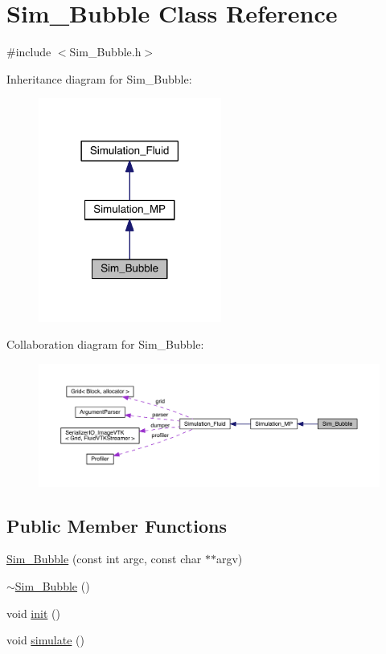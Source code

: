 \hypertarget{class_sim___bubble}{}\section{Sim\+\_\+\+Bubble Class Reference}
\label{class_sim___bubble}


{\ttfamily \#include $<$Sim\+\_\+\+Bubble.\+h$>$}



Inheritance diagram for Sim\+\_\+\+Bubble\+:\nopagebreak
\begin{figure}[H]
\begin{center}
\leavevmode
\includegraphics[width=170pt]{d3/d9c/class_sim___bubble__inherit__graph}
\end{center}
\end{figure}


Collaboration diagram for Sim\+\_\+\+Bubble\+:\nopagebreak
\begin{figure}[H]
\begin{center}
\leavevmode
\includegraphics[width=350pt]{dd/d10/class_sim___bubble__coll__graph}
\end{center}
\end{figure}
\subsection*{Public Member Functions}
\begin{DoxyCompactItemize}
\item 
\hyperlink{class_sim___bubble_aee099c9d070299eec0ef94f190ffb409}{Sim\+\_\+\+Bubble} (const int argc, const char $\ast$$\ast$argv)
\item 
\hyperlink{class_sim___bubble_a61355c24b4da216ebdbc4752a409e118}{$\sim$\+Sim\+\_\+\+Bubble} ()
\item 
void \hyperlink{class_sim___bubble_ae06e5f52f73f0c4e45e049ff8619703e}{init} ()
\item 
void \hyperlink{class_sim___bubble_a80010a9aaf2c9dc9320adfbb23e40344}{simulate} ()
\end{DoxyCompactItemize}
